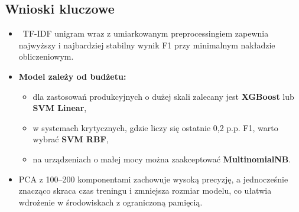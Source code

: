 \documentclass{article}
\begin{document}
\subsection*{Wnioski kluczowe}

\begin{itemize}
    \item \ TF-IDF unigram wraz z umiarkowanym preprocessingiem zapewnia najwyższy i najbardziej stabilny wynik F1 przy minimalnym nakładzie obliczeniowym.
    
    \item \textbf{Model zależy od budżetu:} 
    \begin{itemize}
        \item dla zastosowań produkcyjnych o dużej skali zalecany jest \textbf{XGBoost} lub \textbf{SVM Linear},
        \item w systemach krytycznych, gdzie liczy się ostatnie 0{,}2 p.p. F1, warto wybrać \textbf{SVM RBF},
        \item na urządzeniach o małej mocy można zaakceptować \textbf{MultinomialNB}.
    \end{itemize}

    \item PCA z 100–200 komponentami zachowuje wysoką precyzję, a jednocześnie znacząco skraca czas treningu i zmniejsza rozmiar modelu, co ułatwia wdrożenie w środowiskach z ograniczoną pamięcią.
\end{itemize}
\end{document}
